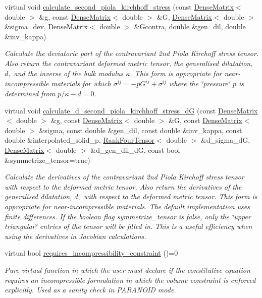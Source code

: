\begin{DoxyCompactItemize}
virtual void \hyperlink{classoomph_1_1ConstitutiveLaw_a26f34355b626bebcad8f498fa5271d20}{calculate\+\_\+second\+\_\+piola\+\_\+kirchhoff\+\_\+stress} (const \hyperlink{classoomph_1_1DenseMatrix}{Dense\+Matrix}$<$ double $>$ \&g, const \hyperlink{classoomph_1_1DenseMatrix}{Dense\+Matrix}$<$ double $>$ \&G, \hyperlink{classoomph_1_1DenseMatrix}{Dense\+Matrix}$<$ double $>$ \&sigma\+\_\+dev, \hyperlink{classoomph_1_1DenseMatrix}{Dense\+Matrix}$<$ double $>$ \&Gcontra, double \&gen\+\_\+dil, double \&inv\+\_\+kappa)
\begin{DoxyCompactList}\small\item\em Calculate the deviatoric part of the contravariant 2nd Piola Kirchoff stress tensor. Also return the contravariant deformed metric tensor, the generalised dilatation, $ d, $ and the inverse of the bulk modulus $ \kappa$. This form is appropriate for near-\/incompressible materials for which $ \sigma^{ij} = -p G^{ij} + \overline{ \sigma^{ij}} $ where the \char`\"{}pressure\char`\"{} $ p $ is determined from $ p / \kappa - d =0 $. \end{DoxyCompactList}\item 
virtual void \hyperlink{classoomph_1_1ConstitutiveLaw_a8a4f1bcac8d308d9ad0013ddf5def505}{calculate\+\_\+d\+\_\+second\+\_\+piola\+\_\+kirchhoff\+\_\+stress\+\_\+dG} (const \hyperlink{classoomph_1_1DenseMatrix}{Dense\+Matrix}$<$ double $>$ \&g, const \hyperlink{classoomph_1_1DenseMatrix}{Dense\+Matrix}$<$ double $>$ \&G, const \hyperlink{classoomph_1_1DenseMatrix}{Dense\+Matrix}$<$ double $>$ \&sigma, const double \&gen\+\_\+dil, const double \&inv\+\_\+kappa, const double \&interpolated\+\_\+solid\+\_\+p, \hyperlink{classoomph_1_1RankFourTensor}{Rank\+Four\+Tensor}$<$ double $>$ \&d\+\_\+sigma\+\_\+dG, \hyperlink{classoomph_1_1DenseMatrix}{Dense\+Matrix}$<$ double $>$ \&d\+\_\+gen\+\_\+dil\+\_\+dG, const bool \&symmetrize\+\_\+tensor=true)
\begin{DoxyCompactList}\small\item\em Calculate the derivatives of the contravariant 2nd Piola Kirchoff stress tensor with respect to the deformed metric tensor. Also return the derivatives of the generalised dilatation, $ d, $ with respect to the deformed metric tensor. This form is appropriate for near-\/incompressible materials. The default implementation uses finite differences. If the boolean flag symmetrize\+\_\+tensor is false, only the \char`\"{}upper  triangular\char`\"{} entries of the tensor will be filled in. This is a useful efficiency when using the derivatives in Jacobian calculations. \end{DoxyCompactList}\item 
virtual bool \hyperlink{classoomph_1_1ConstitutiveLaw_a446452158a8ae9fbc3dde4277155f824}{requires\+\_\+incompressibility\+\_\+constraint} ()=0
\begin{DoxyCompactList}\small\item\em Pure virtual function in which the user must declare if the constitutive equation requires an incompressible formulation in which the volume constraint is enforced explicitly. Used as a sanity check in P\+A\+R\+A\+N\+O\+ID mode. \end{DoxyCompactList}\end{DoxyCompactItemize}
